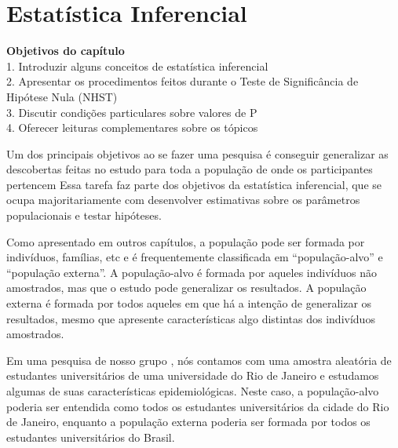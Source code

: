 \documentclass[
]{book}
\newenvironment{objectives}{
  \definecolor{shadecolor}{rgb}{0, 0, 0}  %
  \color{white}
  \begin{shaded}}
 {\end{shaded}}
\begin{document}
\hypertarget{estatuxedstica-inferencial}{%
\chapter{Estatística Inferencial}\label{estatuxedstica-inferencial}}

\begin{objectives}

\textbf{Objetivos do capítulo}\\
1. Introduzir alguns conceitos de estatística inferencial\\
2. Apresentar os procedimentos feitos durante o Teste de Significância de Hipótese Nula (NHST)\\
3. Discutir condições particulares sobre valores de P\\
4. Oferecer leituras complementares sobre os tópicos

\end{objectives}

Um dos principais objetivos ao se fazer uma pesquisa é conseguir generalizar as descobertas feitas no estudo para toda a população de onde os participantes pertencem Essa tarefa faz parte dos objetivos da estatística inferencial, que se ocupa majoritariamente com desenvolver estimativas sobre os parâmetros populacionais e testar hipóteses.

Como apresentado em outros capítulos, a população pode ser formada por indivíduos, famílias, etc e é frequentemente classificada em ``população-alvo'' e ``população externa''. A população-alvo é formada por aqueles indivíduos não amostrados, mas que o estudo pode generalizar os resultados. A população externa é formada por todos aqueles em que há a intenção de generalizar os resultados, mesmo que apresente características algo distintas dos indivíduos amostrados.

Em uma pesquisa de nosso grupo \citep{AfonsoJunior2020}, nós contamos com uma amostra aleatória de estudantes universitários de uma universidade do Rio de Janeiro e estudamos algumas de suas características epidemiológicas. Neste caso, a população-alvo poderia ser entendida como todos os estudantes universitários da cidade do Rio de Janeiro, enquanto a população externa poderia ser formada por todos os estudantes universitários do Brasil.
\end{document}

